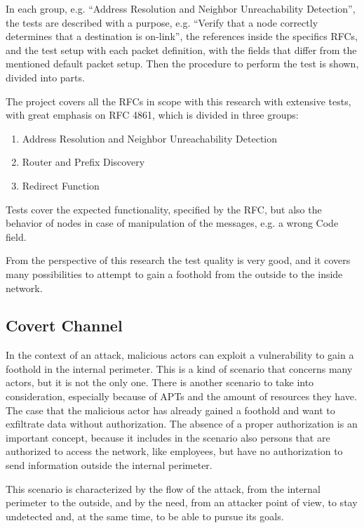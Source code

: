 \documentclass[12pt]{article}
\begin{document}
In each group, e.g. ``Address Resolution and Neighbor Unreachability Detection'', the tests are described with a purpose, e.g. ``Verify that a node correctly determines that a destination is on-link'', the references inside the specifics RFCs, and the test setup with each packet definition, with the fields that differ from the mentioned default packet setup. Then the procedure to perform the test is shown, divided into parts. 

The project covers all the RFCs in scope with this research with extensive tests, with great emphasis on RFC 4861, which is divided in three groups:
\vspace{-10pt}
\begin{enumerate}[noitemsep,topsep=0pt,partopsep=0pt]
 \item Address Resolution and Neighbor Unreachability Detection
 \item Router and Prefix Discovery
 \item Redirect Function
\end{enumerate}

Tests cover the expected functionality, specified by the RFC, but also the behavior of nodes in case of manipulation of the messages, e.g. a wrong Code field.

From the perspective of this research the test quality is very good, and it covers many possibilities to attempt to gain a foothold from the outside to the inside network. 

\subsection{Covert Channel}
\label{sub:covert}


In the context of an attack, malicious actors can exploit a vulnerability to gain a foothold in the internal perimeter. This is a kind of scenario that concerns many actors, but it is not the only one. There is another scenario to take into consideration, especially because of APTs and the amount of resources they have. The case that the malicious actor has already gained a foothold and want to exfiltrate data without authorization. The absence of a proper authorization is an important concept, because it includes in the scenario also persons that are authorized to access the network, like employees, but have no authorization to send information outside the internal perimeter.

This scenario is characterized by the flow of the attack, from the internal perimeter to the outside, and by the need, from an attacker point of view, to stay undetected and, at the same time, to be able to pursue its goals. 
\end{document}
